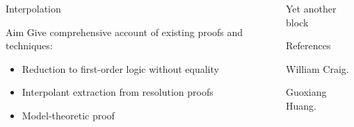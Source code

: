 \documentclass[final,hyperref={pdfpagelabels=true}]{beamer}
\begin{document}
\begin{frame}
\begin{columns}[t]
\begin{column}{.45\textwidth}
\begin{block}{Interpolation}
			\end{block}


			\begin{block}{Aim }
				Give comprehensive account of existing proofs and techniques:
				\begin{itemize}
					\item Reduction to first-order logic without equality
					\item Interpolant extraction from resolution proofs
					\item Model-theoretic proof 
				\end{itemize}
			\end{block}


		\end{column}



		\begin{column}{.45\textwidth}
			\begin{block}{Yet another block}
				\lipsum[5-7]
			\end{block}



			\begin{block}{References}
				\begin{thebibliography}{999}

						William Craig.

						Guoxiang Huang.


\end{thebibliography}
\end{block}
\end{column}
\end{columns}
\end{frame}
\end{document}
